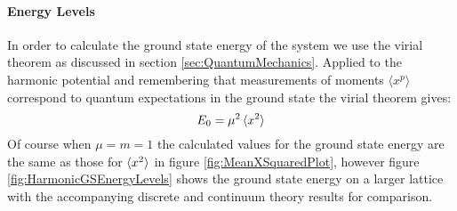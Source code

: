 \documentclass[12pt]{article}
\begin{document}
            \paragraph{Energy Levels}
                In order to calculate the ground state energy of the system we use the virial theorem as discussed in section \ref{sec:QuantumMechanics}. Applied to the harmonic potential and remembering that measurements of moments $\langle x^p\rangle$ correspond to quantum expectations in the ground state the virial theorem gives:
                \begin{equation}
                    \label{eq:HarmonicGroundStateEnergy}
                    E_0 = \mu^2\braket{x^2}
                \end{equation}
                Of course when $\mu=m=1$ the calculated values for the ground state energy are the same as those for $\braket{x^2}$ in figure \ref{fig:MeanXSquaredPlot}, however figure \ref{fig:HarmonicGSEnergyLevels} shows the ground state energy on a larger lattice with the accompanying discrete and continuum theory results for comparison.
\end{document}
